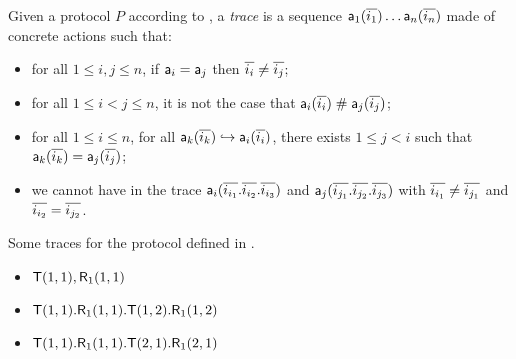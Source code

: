 \begin{definition}
  Given a protocol $P$ according to , a \emph{trace} is a sequence $\textsf{a}_1(\overline{i_1}) \dots \textsf{a}_n(\overline{i_n})$ made of concrete actions such that:
  \begin{itemize}
    \item for all $1 \leq i,j \leq n$, if $\textsf{a}_i = \textsf{a}_j$ then $\overline{i_i} \neq \overline{i_j}$;
    \item for all $1 \leq i < j \leq n$, it is not the case that $\textsf{a}_i(\overline{i_i}) \mathrel{\#} \textsf{a}_j(\overline{i_j})$;
    \item for all $1 \leq i \leq n$, for all $\textsf{a}_k(\overline{i_k}) \hookrightarrow \textsf{a}_i(\overline{i_i})$, there exists $1 \leq j < i$ such that $\textsf{a}_k(\overline{i_k}) = \textsf{a}_j(\overline{i_j})$;
    \item we cannot have in the trace $\textsf{a}_i(\overline{i_{i_1}}.\overline{i_{i_2}}.\overline{i_{i_3}})$ and $\textsf{a}_j(\overline{i_{j_1}}.\overline{i_{j_2}}.\overline{i_{j_3}})$
    with $\overline{i_{i_1}} \neq \overline{i_{j_1}}$ and $\overline{i_{i_2}} = \overline{i_{j_2}}$.
  \end{itemize}
\end{definition}

\begin{example}
  \label{ex:basic-hash-trace}
  Some traces for the protocol defined in .
  \begin{itemize}
    \item $\textsf{T}(1,1),\textsf{R}_1(1,1)$
    \item $\textsf{T}(1,1).\textsf{R}_1(1,1).\textsf{T}(1,2).\textsf{R}_1(1,2)$
    \item $\textsf{T}(1,1).\textsf{R}_1(1,1).\textsf{T}(2,1).\textsf{R}_1(2,1)$
  \end{itemize}
\end{example}

